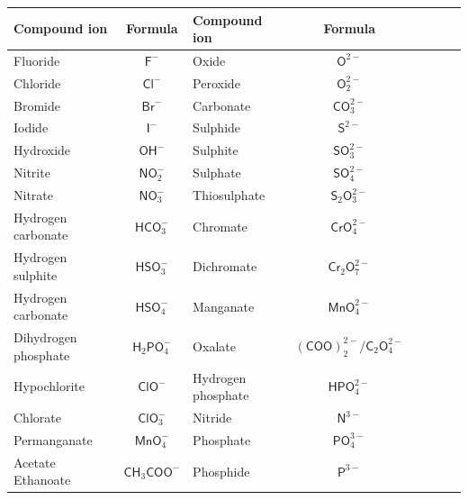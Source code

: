 \begin{enumerate}[noitemsep, label=\textbf{\arabic*}. ]
\begin{table}[H]
\begin{center}
\label{tab:anions}
\begin{tabular}{|l|c|l|c|l|c|l|c|} \hline
\textbf{Compound ion} & \textbf{Formula}            & \textbf{Compound ion} & \textbf{Formula} \\ \hline
Fluoride             & $\mathsf{F}^{-}$             & Oxide              & $\mathsf{O}^{2-}$ \\ \hline
Chloride             & $\mathsf{Cl}^{-}$            & Peroxide           & $\mathsf{O}_{2}^{2-}$ \\ \hline
Bromide              & $\mathsf{Br}^{-}$            & Carbonate          & $\mathsf{CO}_{3}^{2-}$ \\ \hline
Iodide               & $\mathsf{I}^{-}$             & Sulphide           & $\mathsf{S}^{2-}$ \\ \hline
Hydroxide            & $\mathsf{OH}^{-}$            & Sulphite           & $\mathsf{SO}_{3}^{2-}$ \\ \hline
Nitrite              & $\mathsf{NO}_{2}^{-}$        & Sulphate           & $\mathsf{SO}_{4}^{2-}$ \\ \hline
Nitrate              & $\mathsf{NO}_{3}^{-}$        & Thiosulphate       & $\mathsf{S}_{2}{\mathsf{O}}_{3}^{2-}$ \\ \hline
Hydrogen carbonate   & $\mathsf{HCO}_{3}^{-}$       & Chromate           & $\mathsf{CrO}_{4}^{2-}$ \\ \hline
Hydrogen sulphite    & $\mathsf{HSO}_{3}^{-}$       & Dichromate         & $\mathsf{Cr}_{2}{\mathsf{O}}_{7}^{2-}$ \\ \hline
Hydrogen carbonate   & $\mathsf{HSO}_{4}^{-}$       & Manganate          & $\mathsf{MnO}_{4}^{2-}$ \\ \hline
Dihydrogen phosphate & $\mathsf{H}_{2}{\mathsf{PO}}_{4}^{-}$ & Oxalate   & $\mathsf{(COO)}_{2}^{2-}/{\mathsf{C}}_{2}{\mathsf{O}}_{4}^{2-}$ \\ \hline
Hypochlorite         & $\mathsf{ClO}^{-}$           & Hydrogen phosphate & $\mathsf{HPO}_{4}^{2-}$ \\ \hline
Chlorate             & $\mathsf{ClO}_{3}^{-}$       & Nitride            & $\mathsf{N}^{3-}$ \\ \hline
Permanganate         & $\mathsf{MnO}_{4}^{-}$       & Phosphate          & $\mathsf{PO}_{4}^{3-}$ \\ \hline
Acetate Ethanoate    & $\mathsf{CH}_{3}{\mathsf{COO}}^{-}$   & Phosphide          & $\mathsf{P}^{3-}$ \\ \hline
\end{tabular}


\end{center}
\end{table}
\end{enumerate}
